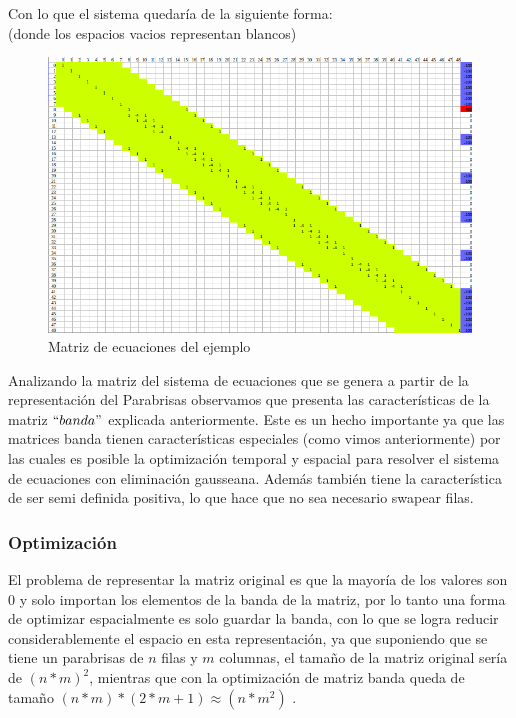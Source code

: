 Con lo que el sistema quedaría de la siguiente forma: \\
(donde los espacios vacios representan blancos)
\begin{figure}
\begin{center}
\includegraphics[scale=0.60]{imagenes/matrizej.png} 
\caption{Matriz de ecuaciones del ejemplo} 
\end{center}
\end{figure}


\newpage


Analizando la matriz del sistema de ecuaciones que se genera a partir de la representación del Parabrisas observamos que presenta las características de la matriz $``banda"$ explicada anteriormente. 
Este es un hecho importante ya que las matrices banda tienen características especiales (como vimos anteriormente) por las cuales es posible la optimización temporal y espacial para resolver el sistema de ecuaciones con eliminación gausseana. Además también tiene la característica de ser semi definida positiva, lo que hace que no sea necesario swapear filas.
\subsubsection{Optimización}

El problema de representar la matriz original es que la mayoría de los valores son 0 y solo importan los elementos de la banda de la matriz, por lo tanto una forma de optimizar espacialmente es solo guardar la banda, con lo que se logra reducir considerablemente el espacio en esta representación, ya que suponiendo que se tiene un parabrisas de $n$ filas y $m$ columnas, el tamaño de la matriz original sería de $(n*m)^2$, mientras que con la optimización de matriz banda queda de tamaño $(n*m)*(2*m+1) \approx (n*m^2)$ .

